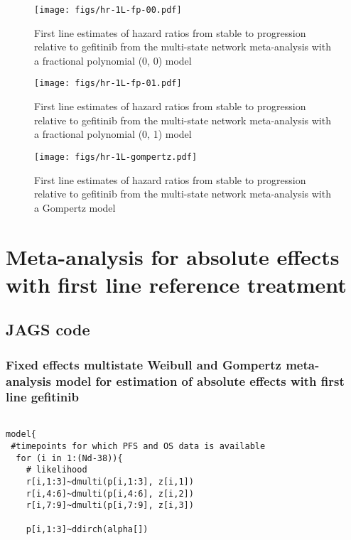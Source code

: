 \documentclass[11pt,final,fleqn]{article}\usepackage[]{graphicx}\usepackage[]{color}
\theoremstyle{plain}
\begin{document}
\begin{appendices}
\begin{figure}[h]
\centering
\texttt{[image: figs/hr-1L-fp-00.pdf]} 
\caption{First line estimates of hazard ratios from stable to progression relative to gefitinib from the multi-state network meta-analysis with a fractional polynomial (0, 0) model}\label{fig:hr-1L-fp-00}
\end{figure}

\begin{figure}[h]
\centering
\texttt{[image: figs/hr-1L-fp-01.pdf]} 
\caption{First line estimates of hazard ratios from stable to progression relative to gefitinib from the multi-state network meta-analysis with a fractional polynomial (0, 1) model}\label{fig:hr-1L-fp-01}
\end{figure}

\begin{figure}
\centering
\texttt{[image: figs/hr-1L-gompertz.pdf]} 
\caption{First line estimates of hazard ratios from stable to progression relative to gefitinib from the multi-state network meta-analysis with a Gompertz model}\label{fig:hr-1L-gompertz}
\end{figure}

\FloatBarrier

\section{Meta-analysis for absolute effects with first line reference treatment}
\subsection{JAGS code}\label{sec:1l-ma-jags}

\subsubsection{Fixed effects multistate Weibull and Gompertz meta-analysis model for estimation of absolute effects with first line gefitinib} 

\begin{verbatim} 

model{
 #timepoints for which PFS and OS data is available
  for (i in 1:(Nd-38)){
    # likelihood
    r[i,1:3]~dmulti(p[i,1:3], z[i,1]) 
    r[i,4:6]~dmulti(p[i,4:6], z[i,2]) 
    r[i,7:9]~dmulti(p[i,7:9], z[i,3]) 
    
    p[i,1:3]~ddirch(alpha[])
    

\end{verbatim}
\end{appendices}
\end{document}

